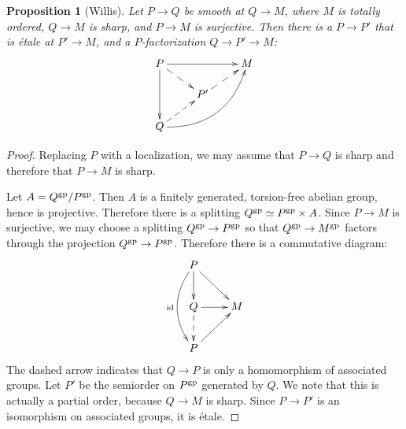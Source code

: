 \documentclass[12pt]{amsart}
\newtheorem{proposition}[theorem]{Proposition}
\theoremstyle{definition}
\theoremstyle{remark}
\begin{document}
\begin{proposition}[Willis] \label{prop:etale-section}
Let $P \to Q$ be smooth at $Q \to M$, where $M$ is totally ordered, $Q \to M$ is sharp, and $P \to M$ is surjective.  Then there is a $P \to P'$ that is \'etale at $P' \to M$, and a $P$-factorization $Q \to P' \to M$:
\begin{equation*} \xymatrix@R=15pt{
P \ar[rr]  \ar@{-->}[dr] \ar[dd] & & M \\
 & P' \ar@{-->}[ur] \\
Q \ar@/_20pt/[uurr] \ar@{-->}[ur] 
} \end{equation*}
\end{proposition}
\begin{proof}
Replacing $P$ with a localization, we may assume that $P \to Q$ is sharp and therefore that $P \to M$ is sharp.  

Let $A = Q^{\rm gp}/ P^{\rm gp}$.  Then $A$ is a finitely generated, torsion-free abelian group, hence is projective.  Therefore there is a splitting $Q^{\rm gp} \simeq P^{\rm gp} \times A$.  Since $P \to M$ is surjective, we may choose a splitting $Q^{\rm gp} \to P^{\rm gp}$ so that $Q^{\rm gp} \to M^{\rm gp}$ factors through the projection $Q^{\rm gp} \to P^{\rm gp}$.  Therefore there is a commutative diagram:
\begin{equation*} \xymatrix{
P \ar[dr] \ar[d] \ar@/_15pt/[dd]_{\mathrm{id}} \\
Q \ar[r] \ar@{-->}[d] & M \\
P \ar[ur]
} \end{equation*}
The dashed arrow indicates that $Q \to P$ is only a homomorphism of associated groups.  Let $P'$ be the semiorder on $P^{\rm gp}$ generated by $Q$.  We note that this is actually a partial order, because $Q \to M$ is sharp.  Since $P \to P'$ is an isomorphism on associated groups, it is \'etale.
\end{proof}
\end{document}
